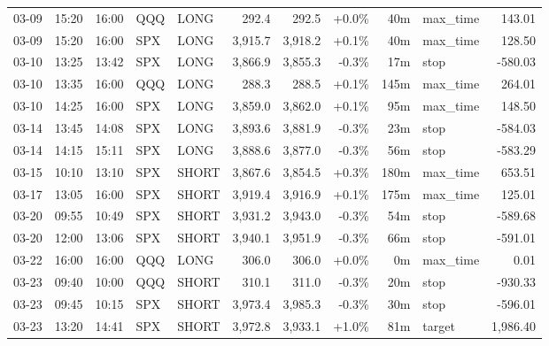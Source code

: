 \documentclass[11pt,a4paper,twoside]{article}
\begin{document}
\begin{center}
\begin{longtable}{>{\color{txtmain}}l l l l l r r r r >{\color{txtmain}}l r}
03-09 & 15:20 & 16:00 & QQQ & LONG & 292.4 & 292.5 & \textcolor{wingreen}{+0.0\%} & 40m & max\_time & \textcolor{wingreen}{143.01} \\
03-09 & 15:20 & 16:00 & SPX & LONG & 3,915.7 & 3,918.2 & \textcolor{wingreen}{+0.1\%} & 40m & max\_time & \textcolor{wingreen}{128.50} \\
03-10 & 13:25 & 13:42 & SPX & LONG & 3,866.9 & 3,855.3 & \textcolor{lossred}{-0.3\%} & 17m & stop & \textcolor{lossred}{-580.03} \\
03-10 & 13:35 & 16:00 & QQQ & LONG & 288.3 & 288.5 & \textcolor{wingreen}{+0.1\%} & 145m & max\_time & \textcolor{wingreen}{264.01} \\
03-10 & 14:25 & 16:00 & SPX & LONG & 3,859.0 & 3,862.0 & \textcolor{wingreen}{+0.1\%} & 95m & max\_time & \textcolor{wingreen}{148.50} \\
03-14 & 13:45 & 14:08 & SPX & LONG & 3,893.6 & 3,881.9 & \textcolor{lossred}{-0.3\%} & 23m & stop & \textcolor{lossred}{-584.03} \\
03-14 & 14:15 & 15:11 & SPX & LONG & 3,888.6 & 3,877.0 & \textcolor{lossred}{-0.3\%} & 56m & stop & \textcolor{lossred}{-583.29} \\
03-15 & 10:10 & 13:10 & SPX & SHORT & 3,867.6 & 3,854.5 & \textcolor{wingreen}{+0.3\%} & 180m & max\_time & \textcolor{wingreen}{653.51} \\
03-17 & 13:05 & 16:00 & SPX & SHORT & 3,919.4 & 3,916.9 & \textcolor{wingreen}{+0.1\%} & 175m & max\_time & \textcolor{wingreen}{125.01} \\
03-20 & 09:55 & 10:49 & SPX & SHORT & 3,931.2 & 3,943.0 & \textcolor{lossred}{-0.3\%} & 54m & stop & \textcolor{lossred}{-589.68} \\
03-20 & 12:00 & 13:06 & SPX & SHORT & 3,940.1 & 3,951.9 & \textcolor{lossred}{-0.3\%} & 66m & stop & \textcolor{lossred}{-591.01} \\
03-22 & 16:00 & 16:00 & QQQ & LONG & 306.0 & 306.0 & \textcolor{wingreen}{+0.0\%} & 0m & max\_time & \textcolor{wingreen}{0.01} \\
03-23 & 09:40 & 10:00 & QQQ & SHORT & 310.1 & 311.0 & \textcolor{lossred}{-0.3\%} & 20m & stop & \textcolor{lossred}{-930.33} \\
03-23 & 09:45 & 10:15 & SPX & SHORT & 3,973.4 & 3,985.3 & \textcolor{lossred}{-0.3\%} & 30m & stop & \textcolor{lossred}{-596.01} \\
03-23 & 13:20 & 14:41 & SPX & SHORT & 3,972.8 & 3,933.1 & \textcolor{wingreen}{+1.0\%} & 81m & target & \textcolor{wingreen}{1,986.40} \\

\end{longtable}
\end{center}
\end{document}
